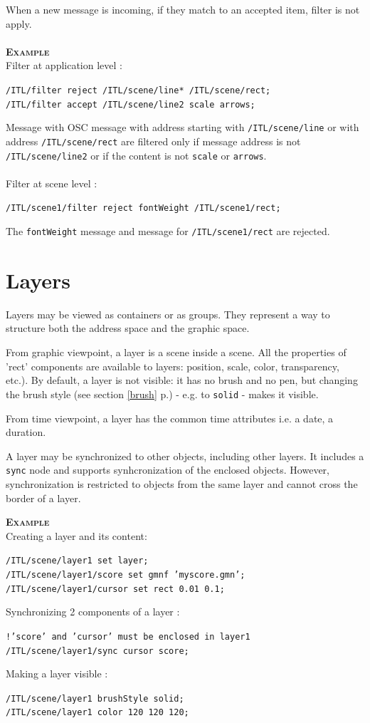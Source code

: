 \documentclass[a4paper,twoside]{report}
\newcommand{\toplevel}[1]	{\chapter{#1}}
\newcommand{\fullref}[1]	{\ref{#1} p.\pageref{#1}}
\newcommand{\OSC}[1]		{\texttt{#1}}
\newcommand{\example}		{\textbf{\hspace{-1.5cm}\textbf{\textsc{Example }}}}
\newcommand{\sample}	[1]			{\vspace{-2mm}\begin{center}\colorbox{mygrey}{
								\begin{minipage}[t]{0.9\columnwidth} 
								{\small \texttt{#1}}
								\end{minipage}}\end{center}}
\begin{document}
When a new message is incoming, if they match to an accepted item, filter is not apply.\\ \\
\example\\
Filter at application level :
\sample{/ITL/filter reject /ITL/scene/line* /ITL/scene/rect; \\
/ITL/filter accept /ITL/scene/line2 scale arrows;
}
Message with OSC message with address starting with \OSC{/ITL/scene/line} or with address \OSC{/ITL/scene/rect} are filtered only if message address is not \OSC{/ITL/scene/line2} or if the content is not \OSC{scale} or \OSC{arrows}.\\
\\
Filter at scene level :
\sample{/ITL/scene1/filter reject fontWeight /ITL/scene1/rect;
}
The \OSC{fontWeight} message and message for \OSC{/ITL/scene1/rect} are rejected.


\toplevel{Layers}
\label{layers}

Layers may be viewed as containers or as groups. They represent a way to structure both the address space and the graphic space. 

From graphic viewpoint, a layer is a scene inside a scene. All the properties of 'rect' components are available to layers: position, scale, color, transparency, etc.). By default, a layer is not visible: it has no brush and no pen, but changing the brush style (see section \fullref{brush}) - e.g. to \OSC{solid} - makes it visible.

From time viewpoint, a layer has the common time attributes i.e. a date, a duration.

A layer may be synchronized to other objects, including other layers. It includes a \OSC{sync} node and supports synhcronization of the enclosed objects. However, synchronization is restricted to objects from the same layer and cannot cross the border of a layer. 


\example \\
Creating a layer and its content:
\sample{/ITL/scene/layer1 set layer;\\
/ITL/scene/layer1/score set gmnf 'myscore.gmn';\\
/ITL/scene/layer1/cursor set rect 0.01 0.1;}

Synchronizing 2 components of a layer :
\sample{!'score' and 'cursor' must be enclosed in layer1 \\
/ITL/scene/layer1/sync cursor score; 
}

Making a layer visible :
\sample{/ITL/scene/layer1 brushStyle solid; \\
/ITL/scene/layer1 color 120 120 120; 
}
\end{document}
